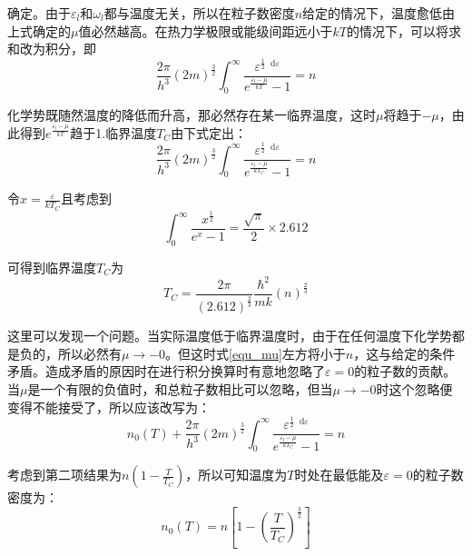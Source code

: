 \documentclass[UTF8]{ctexart}
\newcommand*{\dif}{\mathop{}\!\mathrm{d}}
\begin{document}
\noindent 确定。由于$ \varepsilon_{l} $和$ \omega_{l} $都与温度无关，所以在粒子数密度$ n $给定的情况下，温度愈低由上式确定的$ \mu $值必然越高。在热力学极限或能级间距远小于$ k T $的情况下，可以将求和改为积分，即
\begin{equation}
	\frac{2 \pi}{h^{3}} (2m)^{\frac{3}{2}} \int_{0}^{\infty} \frac{\varepsilon^{\frac{1}{2} \dif \varepsilon}}{e^{\frac{\varepsilon_{l}-\mu}{k T}}-1}=n \label{equ_mu}
\end{equation}

	化学势既随然温度的降低而升高，那必然存在某一临界温度，这时$ \mu $将趋于$ -\mu $，由此得到$ e^{\frac{\varepsilon_{l}-\mu}{k T}} $趋于1.临界温度$ T_{C} $由下式定出：
	\begin{equation}
		\frac{2 \pi}{h^{3}} (2m)^{\frac{3}{2}} \int_{0}^{\infty} \frac{\varepsilon^{\frac{1}{2} \dif \varepsilon}}{e^{\frac{\varepsilon_{l}-\mu}{k T_{C}}}-1}=n
	\end{equation}
	
	令$ x=\frac{\varepsilon}{k T_{C}} $且考虑到
	\begin{equation}
		\int_{0}^{\infty} \frac{x^{\frac{1}{2}}}{e^{x}-1}=\frac{\sqrt{\pi}}{2} \times 2.612
	\end{equation}
	
\noindent 可得到临界温度$ T_{C} $为
	\begin{equation}
		T_{C}=\frac{2 \pi}{(2.612)^{\frac{2}{3}}} \frac{\hbar^{2}}{m k}(n)^{\frac{2}{3}}
	\end{equation}
	
	这里可以发现一个问题。当实际温度低于临界温度时，由于在任何温度下化学势都是负的，所以必然有$ \mu \rightarrow -0 $。但这时式\ref{equ_mu}左方将小于$ n $，这与给定的条件矛盾。造成矛盾的原因时在进行积分换算时有意地忽略了$ \varepsilon=0 $的粒子数的贡献。当$ \mu $是一个有限的负值时，和总粒子数相比可以忽略，但当$ \mu \rightarrow -0 $时这个忽略便变得不能接受了，所以应该改写为：
	\begin{equation}
		n_{0}(T)+\frac{2 \pi}{h^{3}} (2m)^{\frac{3}{2}} \int_{0}^{\infty} \frac{\varepsilon^{\frac{1}{2} \dif \varepsilon}}{e^{\frac{\varepsilon_{l}-\mu}{k T_{C}}}-1}=n
	\end{equation}
	
	考虑到第二项结果为$ n \left(1-\frac{T}{T_{C}}\right) $，所以可知温度为$ T $时处在最低能及$ \varepsilon=0 $的粒子数密度为：
	\begin{equation}
		n_{0}(T)=n \left[1-\left(\frac{T}{T_{C}}\right)^{\frac{3}{2}}\right]\label{equ_n}
	\end{equation}
	
\end{document}
